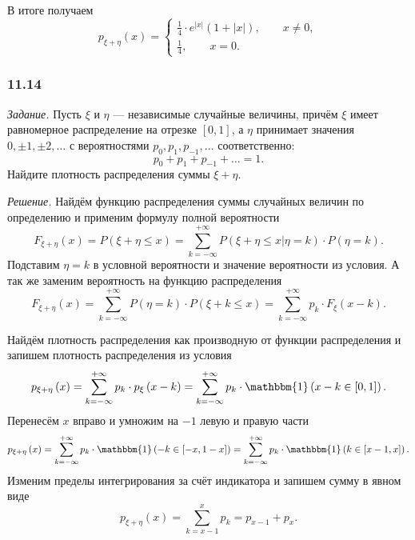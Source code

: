 В итоге получаем
$$p_{ \xi + \eta } \left( x \right) =
\begin{cases}
\frac{1}{4} \cdot e^{ \left| x \right| } \left( 1 + \left| x \right| \right), \qquad x \neq 0, \\
\frac{1}{4}, \qquad x = 0.
\end{cases}$$

\subsubsection*{11.14}

\textit{Задание.}
Пусть $ \xi $ и $ \eta $ --- независимые случайные величины,
причём $ \xi $ имеет равномерное распределение на отрезке $ \left[ 0, 1 \right] $,
а $ \eta $ принимает значения $0, \pm 1, \pm 2, \dotsc $ с вероятностями $p_0, p_1, p_{-1}, \dotsc $ соответственно:
$$p_0 + p_1 + p_{-1} + \dotsc =
1.$$
Найдите плотность распределения суммы $ \xi + \eta $.

\textit{Решение.} Найдём функцию распределения суммы случайных величин по определению и применим формулу полной вероятности
$$F_{ \xi + \eta } \left( x \right) =
P \left( \xi + \eta \leq x \right) =
\sum \limits_{k = - \infty }^{+ \infty } P \left( \left. \xi + \eta \leq x \right| \eta = k \right) \cdot P \left( \eta = k \right).$$
Подставим $ \eta = k$ в условной вероятности и значение вероятности из условия.
А так же заменим вероятность на функцию распределения
$$F_{ \xi + \eta } \left( x \right) =
\sum \limits_{k = - \infty }^{+ \infty } P \left( \eta = k \right) \cdot P \left( \xi + k \leq x \right) =
\sum \limits_{k = - \infty }^{+ \infty } p_k \cdot F_{ \xi } \left( x-k \right).$$

Найдём плотность распределения как производную от функции распределения и запишем плотность распределения из условия
$$p_{ \xi + \eta } \left( x \right) =
\sum \limits_{k = - \infty }^{+ \infty } p_k \cdot p_{ \xi } \left( x-k \right) =
\sum \limits_{k = - \infty }^{+ \infty } p_k \cdot \mathbbm{1} \left( x-k \in \left[ 0, 1 \right] \right).$$
Перенесём $x$ вправо и умножим на $-1$ левую и правую части
$$p_{ \xi + \eta } \left( x \right) =
\sum \limits_{k = - \infty }^{+ \infty } p_k \cdot \mathbbm{1} \left( -k \in \left[ -x, 1-x \right] \right) =
\sum \limits_{k = - \infty }^{+ \infty } p_k \cdot \mathbbm{1} \left( k \in \left[ x-1, x \right] \right).$$
Изменим пределы интегрирования за счёт индикатора и запишем сумму в явном виде
$$p_{ \xi + \eta } \left( x \right) =
\sum \limits_{k =x-1}^{x} p_k =
p_{x-1} + p_x.$$

